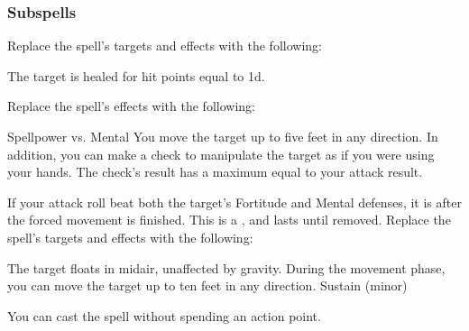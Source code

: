 \subsubsection{Subspells}
Replace the spell's targets and effects with the following:
\begin{spellcontent}
\begin{augmenttargetinginfo}
\end{augmenttargetinginfo}
\begin{augmenteffects}
\spelleffect
The target is healed for hit points equal to  \plus1d.
\end{augmenteffects}
\end{spellcontent}
Replace the spell's effects with the following:
\begin{spellcontent}
\begin{augmenteffects}
\begin{spellattack}{Spellpower vs. Mental}
\spellsuccess
You move the target up to five feet in any direction.
In addition, you can make a check to manipulate the target as if you were using your hands.
The check's result has a maximum equal to your attack result.
\end{spellattack}
\end{augmenteffects}
\end{spellcontent}
If your attack roll beat both the target's Fortitude and Mental defenses, it is \immobilized after the forced movement is finished.
This is a , and lasts until removed.
Replace the spell's targets and effects with the following:
\begin{spellcontent}
\begin{augmenttargetinginfo}
\end{augmenttargetinginfo}
\begin{augmenteffects}
\spelleffect
The target floats in midair, unaffected by gravity.
During the movement phase, you can move the target up to ten feet in any direction.
\spelldur Sustain (minor)
\end{augmenteffects}
\end{spellcontent}
You can cast the spell without spending an action point.

